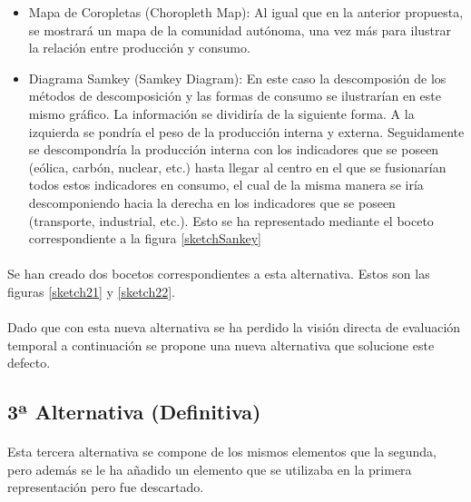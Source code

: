 \documentclass{article}
\begin{document}
				\begin{itemize}
					
					\item Mapa de Coropletas (Choropleth Map): Al igual que en la anterior propuesta, se mostrará un mapa de la comunidad autónoma, una vez más para ilustrar la relación entre producción y consumo.
					
					\item Diagrama  Samkey (Samkey Diagram): En este caso la descomposión de los métodos de descomposición y las formas de consumo se ilustrarían en este mismo gráfico. La información se dividiría de la siguiente forma. A la izquierda se pondría el peso de la producción interna y externa. Seguidamente se descompondría la producción interna con los indicadores que se poseen (eólica, carbón, nuclear, etc.) hasta llegar al centro en el que se fusionarían todos estos indicadores en consumo, el cual de la misma manera se iría descomponiendo hacia la derecha en los indicadores que se poseen (transporte, industrial, etc.). Esto se ha representado mediante el  boceto  correspondiente a la figura \ref{sketchSankey}
							
				\end{itemize}
				
				\paragraph{}
				Se han creado dos bocetos correspondientes a esta alternativa. Estos son las figuras \ref{sketch21} y \ref{sketch22}.
				
				\paragraph{}
				Dado que con esta nueva alternativa se ha perdido la visión directa de evaluación temporal a continuación se propone una nueva alternativa que solucione este defecto.

		\subsection{3ª Alternativa (Definitiva)}

			\paragraph{}
			Esta tercera alternativa se compone de los mismos elementos que la segunda, pero además se le ha añadido un elemento que se utilizaba en la primera representación pero fue descartado. 
			
\end{document}
